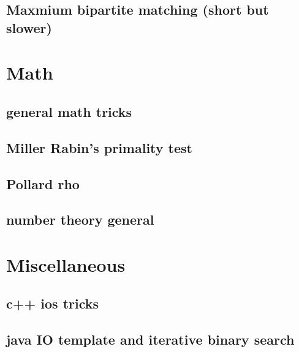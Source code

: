 \subsection{Maxmium bipartite matching (short but slower)}
\raggedbottom
\hrulefill

\section{Math}
\subsection{general math tricks}
\raggedbottom
\hrulefill
\subsection{Miller Rabin's primality test}
\raggedbottom
\hrulefill
\subsection{Pollard rho}
\raggedbottom
\hrulefill
\subsection{number theory general}
\raggedbottom
\hrulefill

\section{Miscellaneous}
\subsection{c++ ios tricks}
\raggedbottom
\hrulefill
\subsection{java IO template and iterative binary search}
\raggedbottom
\hrulefill

